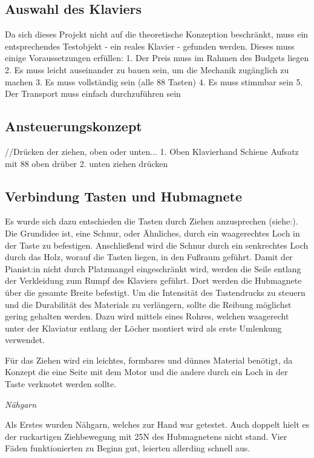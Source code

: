\subsection{Auswahl des Klaviers}

Da sich dieses Projekt nicht auf die theoretische Konzeption beschränkt, muss ein entsprechendes Testobjekt - ein reales Klavier - gefunden werden.
Dieses muss einige Voraussetzungen erfüllen:
	1. Der Preis muss im Rahmen des Budgets liegen
	2. Es muss leicht auseinander zu bauen sein, um die Mechanik zugänglich zu machen
	3. Es muss vollständig sein (alle 88 Tasten)
	4. Es muss stimmbar sein
	5. Der Transport muss einfach durchzuführen sein


\subsection{Ansteuerungskonzept}

//Drücken der ziehen, oben oder unten...
1. Oben
	Klavierhand
	Schiene
	Aufsatz mit 88 oben drüber
2. unten
	ziehen
	drücken



\subsection{Verbindung Tasten und Hubmagnete}

Es wurde sich dazu entschieden die Tasten durch Ziehen anzusprechen (siehe:).
Die Grundidee ist, eine Schnur, oder Ähnliches, durch ein waagerechtes Loch in der Taste zu befestigen.
Anschließend wird die Schnur durch ein senkrechtes Loch durch das Holz, worauf die Tasten liegen, in den Fußraum geführt.
Damit der Pianist:in nicht durch Platzmangel eingeschränkt wird, werden die Seile entlang der Verkleidung zum Rumpf des Klaviers geführt.
Dort werden die Hubmagnete über die gesamte Breite befestigt.
Um die Intensität des Tastendrucks zu steuern und die Durabilität des Materials zu verlängern, sollte die Reibung möglichst gering gehalten werden.
Dazu wird mittels eines Rohres, welchen waagerecht unter der Klaviatur entlang der Löcher montiert wird als erste Umlenkung verwendet.


Für das Ziehen wird ein leichtes, formbares und dünnes Material benötigt, da Konzept die eine Seite mit dem Motor und die andere durch ein Loch in der Taste verknotet werden sollte.

\textit{Nähgarn}

Als Erstes wurden Nähgarn, welches zur Hand war getestet.
Auch doppelt hielt es der ruckartigen Ziehbewegung mit 25N des Hubmagnetens nicht stand.
Vier Fäden funktionierten zu Beginn gut, leierten allerding schnell aus.

